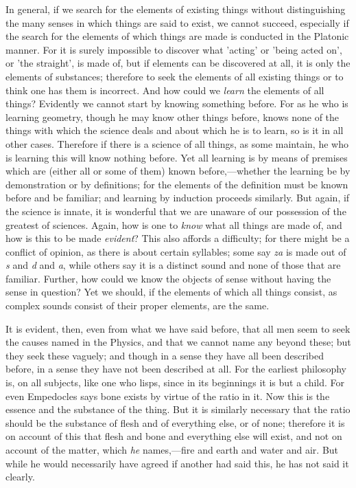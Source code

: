 In general, if we search for the elements of existing things without distinguishing the many senses in which things are said to exist, we cannot succeed, especially if the search for the elements of which things are made is conducted in the Platonic manner. For it is surely impossible to discover what 'acting' or 'being acted on', or 'the straight', is made of, but if elements can be discovered at all, it is only the elements of substances; therefore to seek the elements of all existing things or to think one has them is incorrect. And how could we \emph{learn} the elements of all things? Evidently we cannot start by knowing something before. For as he who is learning geometry, though he may know other things before, knows none of the things with which the science deals and about which he is to learn, so is it in all other cases. Therefore if there is a science of all things, as some maintain, he who is learning this will know nothing before. Yet all learning is by means of premises which are (either all or some of them) known before,—whether the learning be by demonstration or by definitions; for the elements of the definition must be known before and be familiar; and learning by induction proceeds similarly. But again, if the science is innate, it is wonderful that we are unaware of our possession of the greatest of sciences. Again, how is one to \emph{know} what all things are made of, and how is this to be made \emph{evident}? This also affords a difficulty; for there might be a conflict of opinion, as there is about certain syllables; some say \emph{za} is made out of \emph{s} and \emph{d} and \emph{a}, while others say it is a distinct sound and none of those that are familiar. Further, how could we know the objects of sense without having the sense in question? Yet we should, if the elements of which all things consist, as complex sounds consist of their proper elements, are the same.


It is evident, then, even from what we have said before, that all men seem to seek the causes named in the Physics, and that we cannot name any beyond these; but they seek these vaguely; and though in a sense they have all been described before, in a sense they have not been described at all. For the earliest philosophy is, on all subjects, like one who lisps, since in its beginnings it is but a child. For even Empedocles says bone exists by virtue of the ratio in it. Now this is the essence and the substance of the thing. But it is similarly necessary that the ratio should be the substance of flesh and of everything else, or of none; therefore it is on account of this that flesh and bone and everything else will exist, and not on account of the matter, which \emph{he} names,—fire and earth and water and air. But while he would necessarily have agreed if another had said this, he has not said it clearly.

